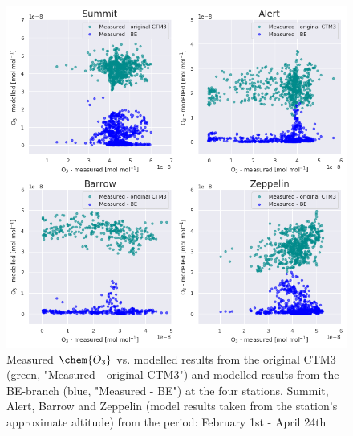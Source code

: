 \begin{figure}[ht]
    \centering
    \includegraphics[width = \linewidth]{Chapter6_Results/images/scatter_feb_apr.png}
    \caption{Measured $\chem{O_3}$ vs. modelled results from the original CTM3 (green, "Measured - original CTM3") and modelled results from the BE-branch (blue, "Measured - BE") at the four stations, Summit, Alert, Barrow and Zeppelin (model results taken from the station's approximate altitude) from the period: February 1st - April 24th}
    \label{fig:scatter_FebApr}
\end{figure}
